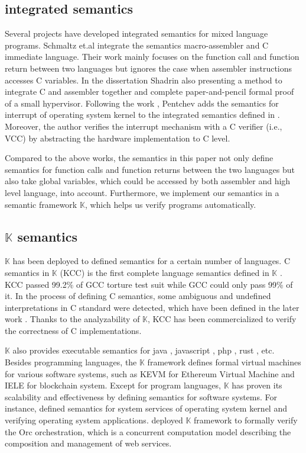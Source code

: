 \documentclass[letterpaper, 10 pt, conference]{IEEEtran}
\begin{document}
\subsection{integrated semantics}
Several projects have developed integrated semantics for mixed language programs. Schmaltz \cite{Schmaltz} et.al integrate the semantics    macro-assembler and C immediate language. Their work mainly focuses on the function call and function return between two languages but ignores the case when assembler instructions accesses C variables. In the dissertation  \cite{Shadrin} Shadrin also presenting a method to integrate C and assembler together and complete paper-and-pencil
formal proof of a small hypervisor. Following the work \cite{Shadrin}, Pentchev \cite{Pentchev} adds the semantics for interrupt of operating system kernel to the integrated semantics defined in \cite{Shadrin}.  Moreover, the author verifies the interrupt mechanism with a C verifier (i.e., VCC) \cite{vcc} by abstracting the hardware implementation to C level.
\par Compared to the above works, the semantics in this paper not only define semantics for function calls and function returns between the two languages but also take global variables, which could be accessed by both assembler and high level language, into account. Furthermore, we implement our semantics in a semantic framework $\mathbb{K}$, which helps us verify programs automatically.
\subsection{$\mathbb{K}$ semantics}
\par $\mathbb{K}$ has been deployed to defined semantics for a certain number of languages. C semantics in $\mathbb{K}$ (KCC) is the first complete language semantics defined in $\mathbb{K}$ \cite{C1}. KCC passed 99.2\% of GCC torture test suit while GCC could only pass 99\% of it. In the process of defining C semantics, some ambiguous and undefined interpretations in C standard were detected, which have been defined in the later work \cite{C2}. Thanks to the analyzability of $\mathbb{K}$, KCC has been commercialized to verify the correctness of C implementations.

$\mathbb{K}$ also provides executable semantics for java \cite{java}, javascript \cite{js}, php \cite{php}, rust \cite{rust}, etc. Besides programming
languages, the $\mathbb{K}$ framework defines formal virtual machines for various software systems, such as KEVM \cite{KEVM} for Ethereum Virtual Machine \cite{evm} and IELE \cite{KIELE,IELE} for blockchain system. Except for program languages, $\mathbb{K}$ has  proven its scalability and effectiveness by defining semantics for software systems. For instance, \cite{xiaoran} defined semantics for system services of operating system kernel and verifying operating system applications. \cite{orc} deployed $\mathbb{K}$ framework to formally verify the Orc orchestration, which is a concurrent computation model describing the composition and management of web services.
\end{document}
